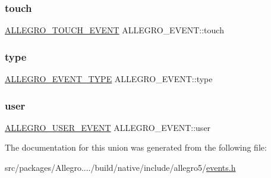 \subsubsection{\texorpdfstring{touch}{touch}}
{\footnotesize\ttfamily \hyperlink{struct_a_l_l_e_g_r_o___t_o_u_c_h___e_v_e_n_t}{A\+L\+L\+E\+G\+R\+O\+\_\+\+T\+O\+U\+C\+H\+\_\+\+E\+V\+E\+NT} A\+L\+L\+E\+G\+R\+O\+\_\+\+E\+V\+E\+N\+T\+::touch}

\mbox{\label{union_a_l_l_e_g_r_o___e_v_e_n_t_a0f6695598fd63039c806386a91cfc9f4}} 
\subsubsection{\texorpdfstring{type}{type}}
{\footnotesize\ttfamily \hyperlink{events_8h_adb888c90ea2fb98666e07eff730fd284}{A\+L\+L\+E\+G\+R\+O\+\_\+\+E\+V\+E\+N\+T\+\_\+\+T\+Y\+PE} A\+L\+L\+E\+G\+R\+O\+\_\+\+E\+V\+E\+N\+T\+::type}

\mbox{\label{union_a_l_l_e_g_r_o___e_v_e_n_t_aa332ac2bdad5865354e4a20c982c86f7}} 
\subsubsection{\texorpdfstring{user}{user}}
{\footnotesize\ttfamily \hyperlink{struct_a_l_l_e_g_r_o___u_s_e_r___e_v_e_n_t}{A\+L\+L\+E\+G\+R\+O\+\_\+\+U\+S\+E\+R\+\_\+\+E\+V\+E\+NT} A\+L\+L\+E\+G\+R\+O\+\_\+\+E\+V\+E\+N\+T\+::user}



The documentation for this union was generated from the following file\+:\begin{DoxyCompactItemize}
\item 
src/packages/\+Allegro..../build/native/include/allegro5/\hyperlink{events_8h}{events.\+h}\end{DoxyCompactItemize}

